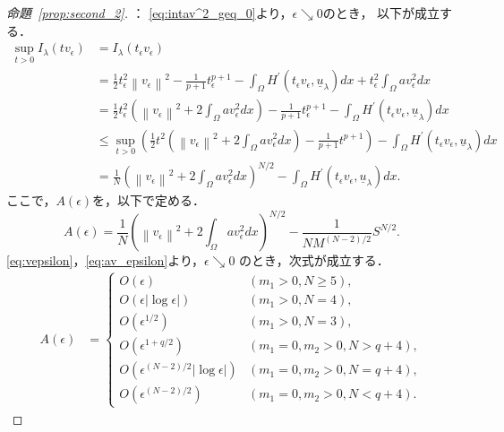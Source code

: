 \begin{proof}[命題~\ref{prop:second_2}]
 ：
 \eqref{eq:intav^2_geq_0}より，$\epsilon \searrow 0$のとき，
 以下が成立する．
 \begin{align*}
  \sup_{t > 0} I_\lambda (t v_\epsilon) & = I_\lambda (t_\epsilon
  v_\epsilon) \\ 
  & = \frac{1}{2} t_\epsilon^2 \left\| v_\epsilon \right\|^2 -
  \frac{1}{p+1} t_\epsilon^{p+1} - \int_\Omega H^\prime(t_\epsilon
  v_\epsilon, \underline{u}_\lambda) dx + t_\epsilon^2
  \int_\Omega a v_\epsilon^2
  dx \\
  & = \frac{1}{2} t_\epsilon^2 \left(
  \left\| v_\epsilon \right\|^2 + 2 \int_\Omega av_\epsilon^2 dx \right) -
  \frac{1}{p+1} t_\epsilon^{p+1} - \int_\Omega H^\prime(t_\epsilon
  v_\epsilon, \underline{u}_\lambda) dx \\
  & \leq \sup_{t > 0} \left( \frac{1}{2} t^2 \left(\left\| v_\epsilon
  \right\|^2 + 2 \int_\Omega av_\epsilon^2 dx \right)
  - \frac{1}{p+1} t^{p+1} \right)
  - \int_\Omega H^\prime(t_\epsilon
  v_\epsilon, \underline{u}_\lambda) dx \\
  & = \frac{1}{N} \left( \left\| v_\epsilon \right\|^2
  + 2 \int_\Omega av_\epsilon^2 dx \right)^{N/2}
  - \int_\Omega H^\prime(t_\epsilon
  v_\epsilon, \underline{u}_\lambda) dx.
 \end{align*}
 ここで，$A(\epsilon)$を，以下で定める．
 \[
  A(\epsilon) = \frac{1}{N}
 \left( \left\| v_\epsilon \right\|^2
 + 2 \int_\Omega av_\epsilon^2 dx \right)^{N/2} - 
 \frac{1}{NM^{(N-2)/2}} S^{N/2}.
 \]
\eqref{eq:vepsilon}，\eqref{eq:av_epsilon}より，$\epsilon \searrow 0$
のとき，次式が成立する．
 \begin{equation}
  \begin{aligned}
   A(\epsilon) &=
   \begin{cases}
    O(\epsilon) & (m_1 > 0, N \geq 5), \\
    O(\epsilon \lvert \log \epsilon \rvert) & (m_1 > 0, N = 4), \\
    O(\epsilon^{1/2}) & (m_1 > 0, N = 3), \\
    O(\epsilon^{1 + q/2 }) & (m_1 = 0, m_2 > 0,  N > q + 4), \\
    O(\epsilon^{(N-2)/2} \lvert \log \epsilon \rvert) & (m_1 = 0, m_2 > 0,
    N = q + 4), \\
    O(\epsilon^{(N-2)/2}) & (m_1 = 0, m_2 > 0, N < q + 4).
   \end{cases}
  \end{aligned} \label{eq:Aepsilon}
 \end{equation}

\end{proof}
